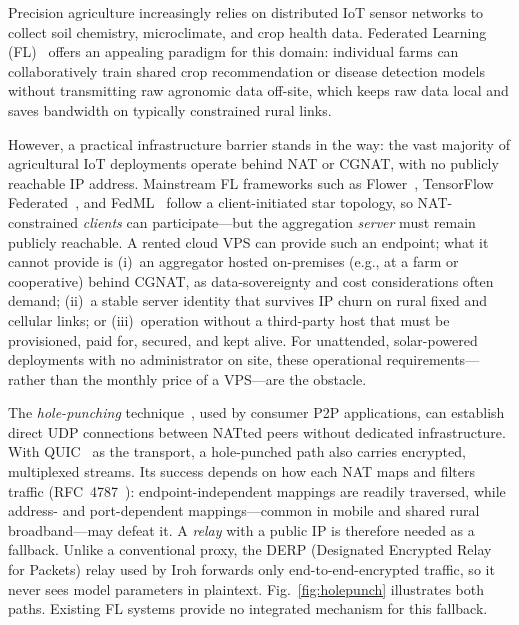 Precision agriculture increasingly relies on distributed IoT sensor networks to collect soil chemistry, microclimate, and crop health data. Federated Learning (FL)~\cite{mcmahan2017} offers an appealing paradigm for this domain: individual farms can collaboratively train shared crop recommendation or disease detection models without transmitting raw agronomic data off-site, which keeps raw data local and saves bandwidth on typically constrained rural links.

However, a practical infrastructure barrier stands in the way: the vast majority of agricultural IoT deployments operate behind NAT or CGNAT, with no publicly reachable IP address. Mainstream FL frameworks such as Flower~\cite{flower2022}, TensorFlow Federated~\cite{tff2019}, and FedML~\cite{fedml2020} follow a client-initiated star topology, so NAT-constrained \emph{clients} can participate---but the aggregation \emph{server} must remain publicly reachable. A rented cloud VPS can provide such an endpoint; what it cannot provide is (i)~an aggregator hosted on-premises (e.g., at a farm or cooperative) behind CGNAT, as data-sovereignty and cost considerations often demand; (ii)~a stable server identity that survives IP churn on rural fixed and cellular links; or (iii)~operation without a third-party host that must be provisioned, paid for, secured, and kept alive. For unattended, solar-powered deployments with no administrator on site, these operational requirements---rather than the monthly price of a VPS---are the obstacle.

The \emph{hole-punching} technique~\cite{ford2005}, used by consumer P2P applications, can establish direct UDP connections between NATted peers without dedicated infrastructure. With QUIC~\cite{rfc9000} as the transport, a hole-punched path also carries encrypted, multiplexed streams. Its success depends on how each NAT maps and filters traffic (RFC~4787~\cite{rfc4787}): endpoint-independent mappings are readily traversed, while address- and port-dependent mappings---common in mobile and shared rural broadband---may defeat it. A \emph{relay} with a public IP is therefore needed as a fallback. Unlike a conventional proxy, the DERP (Designated Encrypted Relay for Packets) relay used by Iroh forwards only end-to-end-encrypted traffic, so it never sees model parameters in plaintext. Fig.~\ref{fig:holepunch} illustrates both paths. Existing FL systems provide no integrated mechanism for this fallback.

